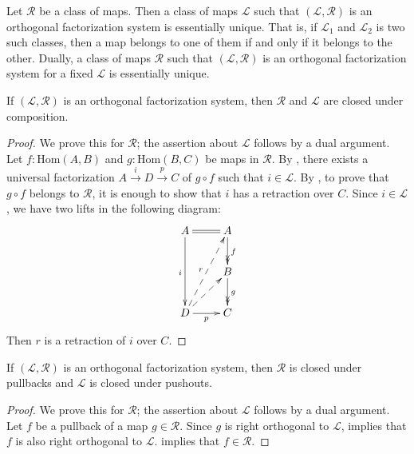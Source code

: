 \documentclass[reqno]{mscs}
\newcommand{\fs}[1]{\mathrm{#1}}
\newcommand{\Hom}{\fs{Hom}}
\numberwithin{figure}{section}
\begin{document}
\begin{cor}
Let $\mathcal{R}$ be a class of maps.
Then a class of maps $\mathcal{L}$ such that $(\mathcal{L},\mathcal{R})$ is an orthogonal factorization system is essentially unique.
That is, if $\mathcal{L}_1$ and $\mathcal{L}_2$ is two such classes, then a map belongs to one of them if and only if it belongs to the other.
Dually, a class of maps $\mathcal{R}$ such that $(\mathcal{L},\mathcal{R})$ is an orthogonal factorization system for a fixed $\mathcal{L}$ is essentially unique.
\end{cor}

\begin{prop}
If $(\mathcal{L},\mathcal{R})$ is an orthogonal factorization system, then $\mathcal{R}$ and $\mathcal{L}$ are closed under composition.
\end{prop}
\begin{proof}
We prove this for $\mathcal{R}$; the assertion about $\mathcal{L}$ follows by a dual argument.
Let $f : \Hom(A,B)$ and $g : \Hom(B,C)$ be maps in $\mathcal{R}$.
By , there exists a universal factorization $A \xrightarrow{i} D \xrightarrow{p} C$ of $g \circ f$ such that $i \in \mathcal{L}$.
By , to prove that $g \circ f$ belongs to $\mathcal{R}$, it is enough to show that $i$ has a retraction over $C$.
Since $i \in \mathcal{L}$, we have two lifts in the following diagram:
\[ \xymatrix{ A \ar@{=}[r] \ar[dd]_i                    & A \ar@{->>}[d]^f \\
                                                        & B \ar@{->>}[d]^g \\
              D \ar[r]_p \ar@{-->}[ur] \ar@{-->}[uur]^r & C
            } \]
Then $r$ is a retraction of $i$ over $C$.
\end{proof}

\begin{prop}
If $(\mathcal{L},\mathcal{R})$ is an orthogonal factorization system, then $\mathcal{R}$ is closed under pullbacks and $\mathcal{L}$ is closed under pushouts.
\end{prop}
\begin{proof}
We prove this for $\mathcal{R}$; the assertion about $\mathcal{L}$ follows by a dual argument.
Let $f$ be a pullback of a map $g \in \mathcal{R}$.
Since $g$ is right orthogonal to $\mathcal{L}$,  implies that $f$ is also right orthogonal to $\mathcal{L}$.
 implies that $f \in \mathcal{R}$.
\end{proof}
\end{document}
